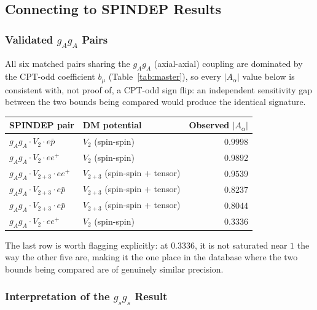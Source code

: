 \documentclass[main]{subfiles}
\begin{document}
\subsection{Connecting to SPINDEP Results}

\subsubsection{Validated \texorpdfstring{$g_Ag_A$}{gAgA} Pairs}

All six matched pairs sharing the $g_Ag_A$ (axial-axial) coupling are
dominated by the CPT-odd coefficient $b_\mu$ (Table~\ref{tab:master}), so
every $|A_\alpha|$ value below is consistent with, not proof of, a
CPT-odd sign flip: an independent sensitivity gap between the two bounds
being compared would produce the identical signature.

\begin{table}[h]
\centering
\small
\begin{tabular}{@{}l l r@{}}
\toprule
SPINDEP pair & DM potential & Observed $|A_\alpha|$ \\
\midrule
$g_Ag_A\cdot V_2\cdot e\bar p$      & $V_2$ (spin-spin)             & $0.9998$ \\
$g_Ag_A\cdot V_2\cdot ee^+$         & $V_2$ (spin-spin)             & $0.9892$ \\
$g_Ag_A\cdot V_{2+3}\cdot ee^+$     & $V_{2+3}$ (spin-spin + tensor) & $0.9539$ \\
$g_Ag_A\cdot V_{2+3}\cdot e\bar p$  & $V_{2+3}$ (spin-spin + tensor) & $0.8237$ \\
$g_Ag_A\cdot V_{2+3}\cdot e\bar p$  & $V_{2+3}$ (spin-spin + tensor) & $0.8044$ \\
$g_Ag_A\cdot V_2\cdot ee^+$         & $V_2$ (spin-spin)             & $0.3336$ \\
\bottomrule
\end{tabular}
\end{table}

The last row is worth flagging explicitly: at $0.3336$, it is not
saturated near $1$ the way the other five are, making it the one place
in the database where the two bounds being compared are of genuinely
similar precision.

\subsubsection{Interpretation of the \texorpdfstring{$g_sg_s$}{gsgs} Result}
\end{document}
